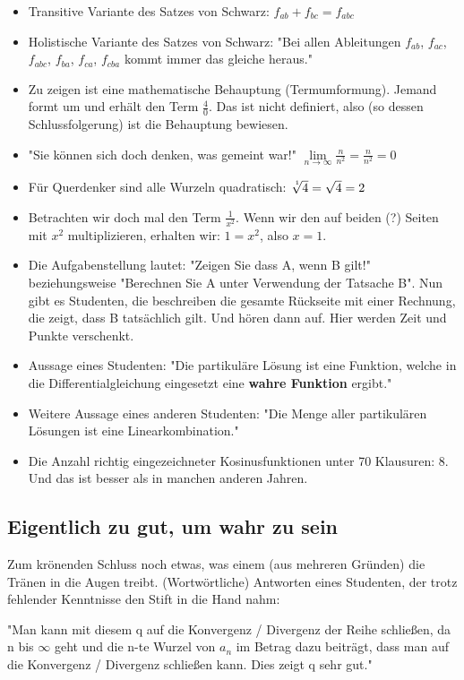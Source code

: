 \begin{itemize}
	\item Transitive Variante des Satzes von Schwarz: $f_{ab}+f_{bc}=f_{abc}$
	\item Holistische Variante des Satzes von Schwarz: "Bei allen Ableitungen $f_{ab}$, $f_{ac}$, $f_{abc}$, $f_{ba}$, $f_{ca}$, $f_{cba}$ kommt immer das gleiche heraus."
	\item Zu zeigen ist eine mathematische Behauptung (Termumformung). Jemand formt um und erhält den Term ${\frac{4}{0}}$. Das ist nicht definiert, also (so dessen Schlussfolgerung) ist die Behauptung bewiesen.
	\item "Sie können sich doch denken, was gemeint war!" $\lim\limits_{n\to\infty} \frac{n}{n^2} = \frac{n}{n^2} = 0$
	\item Für Querdenker sind alle Wurzeln quadratisch: $\nroot{1}{4} = \sqrt{4} = 2$
	\item Betrachten wir doch mal den Term $\frac{1}{x^2}$. Wenn wir den auf beiden (?) Seiten mit $x^2$ multiplizieren, erhalten wir: $1=x^2$, also $x=1$.
	\item Die Aufgabenstellung lautet: "Zeigen Sie dass A, wenn B gilt!" beziehungsweise "Berechnen  Sie A unter Verwendung der Tatsache B". Nun gibt es Studenten, die beschreiben die gesamte Rückseite mit einer Rechnung, die zeigt, dass B tatsächlich gilt. Und hören dann auf. Hier werden Zeit und Punkte verschenkt.
	\item Aussage eines Studenten: "Die partikuläre Lösung ist eine Funktion, welche in die Differentialgleichung eingesetzt eine \textbf{wahre Funktion} ergibt."
	\item Weitere Aussage eines anderen Studenten: "Die Menge aller partikulären Lösungen ist eine Linearkombination."
	\item Die Anzahl richtig eingezeichneter Kosinusfunktionen unter 70 Klausuren: 8. Und das ist besser als in manchen anderen Jahren.	
\end{itemize}

\subsection* {Eigentlich zu gut, um wahr zu sein}

Zum krönenden Schluss noch etwas, was einem (aus mehreren Gründen) die Tränen in die Augen treibt. (Wortwörtliche) Antworten eines Studenten, der trotz fehlender Kenntnisse den Stift in die Hand nahm:

\begin{displayquote}
	"Man kann mit diesem q auf die Konvergenz / Divergenz der Reihe schließen, da n bis $\infty$ geht und die n-te Wurzel von $a_n$ im Betrag dazu beiträgt, dass man auf die Konvergenz / Divergenz schließen kann. Dies zeigt q sehr gut."	
\end{displayquote}

